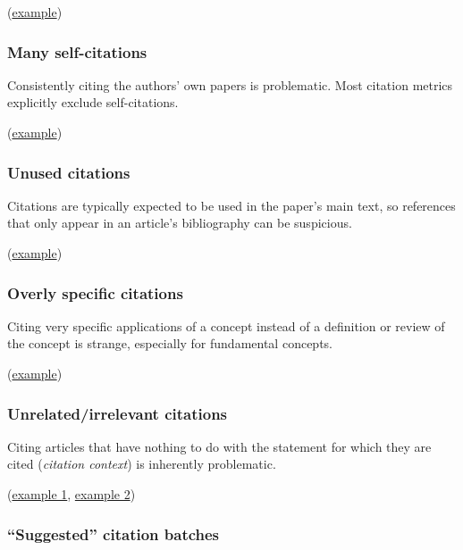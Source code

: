 \documentclass[letterpaper, 12pt]{article}
\begin{document}
(\href{https://pubpeer.com/publications/0C7C1F371CB05161EEACC303692521}{example})

\subsubsection*{Many self-citations}

Consistently citing the authors' own papers is problematic. Most citation metrics explicitly exclude self-citations.

(\href{https://pubpeer.com/publications/3EAC0C5735F8D48FF1D4B06C6BFC30}{example})

\subsubsection*{Unused citations}

Citations are typically expected to be used in the paper's main text, so references that only appear in an article's bibliography can be suspicious.

(\href{https://pubpeer.com/publications/0C7E7F2703724338046FF2A0AA8392}{example})

\subsubsection*{Overly specific citations}

Citing very specific applications of a concept instead of a definition or review of the concept is strange, especially for fundamental concepts.

(\href{https://pubpeer.com/publications/5A064B2F4AE7F13D6E1F559F84492F}{example})

\subsubsection*{Unrelated/irrelevant citations}

Citing articles that have nothing to do with the statement for which they are cited (\emph{citation context}) is inherently problematic.

(\href{https://pubpeer.com/publications/B9CE2B145B02E439BA9C5B2C2D5F12}{example 1}, \href{https://pubpeer.com/publications/C21D670DD4C94B02C78809A55ED385}{example 2})

\subsubsection*{``Suggested'' citation batches}
\end{document}
